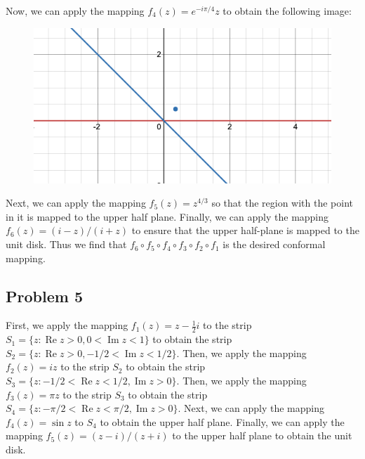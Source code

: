 \documentclass[12pt]{article}
\DeclareMathOperator{\imag}{Im}
\DeclareMathOperator{\re}{Re}
\begin{document}
Now, we can apply the mapping $f_4(z) = e^{-i\pi/4}z$ to obtain the following image:
\begin{figure}[H]
\centering
\includegraphics[width=\textwidth]{Image5}
\end{figure}
Next, we can apply the mapping $f_5(z) = z^{4/3}$ so that the region with the point in it is mapped to the upper half plane. Finally, we can apply the mapping $f_6(z) = (i-z)/(i+z)$ to ensure that the upper half-plane is mapped to the unit disk. Thus we find that $f_6\circ f_5 \circ f_4 \circ f_3 \circ f_2 \circ f_1$ is the desired conformal mapping.
\newpage
\subsection*{Problem 5}
First, we apply the mapping $f_1(z) = z - \frac{1}{2}i$ to the  strip $S_1 = \{z : \re z > 0, 0 < \imag z < 1\}$ to obtain the strip $S_2 = \{z : \re z > 0, -1/2 < \imag z < 1/2\}$. Then, we apply the mapping $f_2(z) = iz$ to the strip $S_2$ to obtain the strip $S_3 = \{z : -1/2 < \re z < 1/2, \imag z > 0\}$. Then, we apply the mapping $f_3(z) = \pi z$ to the strip $S_3$ to obtain the strip $S_4 = \{z : -\pi/2< \re z < \pi/2, \imag z > 0\}$. Next, we can apply the mapping $f_4(z) = \sin z$ to $S_4$ to obtain the upper half plane. Finally, we can apply the mapping $f_5(z) = (z-i)/(z+i)$ to the upper half plane to obtain the unit disk.
\end{document}
